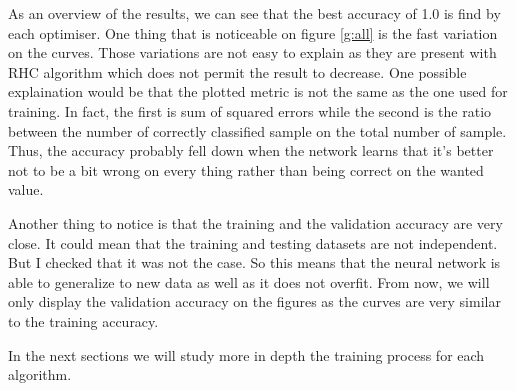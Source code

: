 \documentclass[twocolumn, 10pt]{article}
\begin{document}
			As an overview of the results, we can see that the best accuracy of 1.0 is find by each optimiser. One thing that is noticeable on figure \ref{g:all} is the fast variation on the curves. Those variations are not easy to explain as they are present with RHC algorithm which does not permit the result to decrease. One possible explaination would be that the plotted metric is not the same as the one used for training. In fact, the first is sum of squared errors while the second is the ratio between the number of correctly classified sample on the total number of sample. Thus, the accuracy probably fell down when the network learns that it's better not to be a bit wrong on every thing rather than being correct on the wanted value.

			Another thing to notice is that the training and the validation accuracy are very close. It could mean that the training and testing datasets are not independent. But I checked that it was not the case. So this means that the neural network is able to generalize to new data as well as it does not overfit. From now, we will only display the validation accuracy on the figures as the curves are very similar to the training accuracy.

			In the next sections we will study more in depth the training process for each algorithm.
\end{document}
